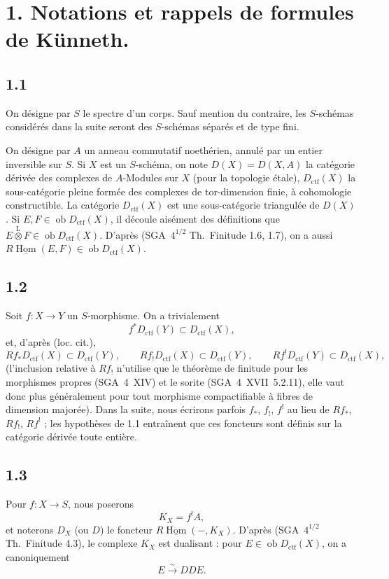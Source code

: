 \documentclass[11pt]{article}
\DeclareMathOperator{\Hom}{Hom}
\newcommand{\ob}{\operatorname{ob}}
\providecommand{\ctf}{\mathrm{ctf}}
\providecommand{\Hom}{\operatorname{Hom}}
\providecommand{\ob}{\operatorname{ob}}
\providecommand{\Hom}{\operatorname{Hom}}
\begin{document}
\section*{1. Notations et rappels de formules de Künneth.}

\subsection*{1.1}
On désigne par $S$ le spectre d'un corps. Sauf mention du contraire, les $S$-schémas considérés dans la suite seront des $S$-schémas séparés et de type fini.

On désigne par $A$ un anneau commutatif noethérien, annulé par un entier inversible sur $S$. Si $X$ est un $S$-schéma, on note $D(X)=D(X,A)$ la catégorie dérivée des complexes de $A$-Modules sur $X$ (pour la topologie étale), $D_{\ctf}(X)$ la sous-catégorie pleine formée des complexes de tor-dimension finie, à cohomologie constructible. La catégorie $D_{\ctf}(X)$ est une sous-catégorie triangulée de $D(X)$. Si $E,F \in \ob D_{\ctf}(X)$, il découle aisément des définitions que $E \overset{\mathrm{L}}{\otimes} F \in \ob D_{\ctf}(X)$. D'après (SGA~$4^{1/2}$ Th.~Finitude 1.6, 1.7), on a aussi $R\underline{\Hom}(E,F) \in \ob D_{\ctf}(X)$.

\subsection*{1.2}
Soit $f:X\to Y$ un $S$-morphisme. On a trivialement
\[
f^{*}D_{\ctf}(Y) \subset D_{\ctf}(X),
\]
et, d'après (loc. cit.),
\[
Rf_{*}D_{\ctf}(X) \subset D_{\ctf}(Y),\qquad
Rf_{!}D_{\ctf}(X) \subset D_{\ctf}(Y),\qquad
Rf^{!}D_{\ctf}(Y) \subset D_{\ctf}(X),
\]
(l'inclusion relative à $Rf_{!}$ n'utilise que le théorème de finitude pour les morphismes propres (SGA~4~XIV) et le sorite (SGA~4~XVII~5.2.11), elle vaut donc plus généralement pour tout morphisme compactifiable à fibres de dimension majorée). Dans la suite, nous écrirons parfois $f_{*}$, $f_{!}$, $f^{!}$ au lieu de $Rf_{*}$, $Rf_{!}$, $Rf^{!}$ ; les hypothèses de 1.1 entraînent que ces foncteurs sont définis sur la catégorie dérivée toute entière.

\subsection*{1.3}
Pour $f:X\to S$, nous poserons
\[
K_X=f^{!}A,
\]
et noterons $D_X$ (ou $D$) le foncteur $R\underline{\Hom}(-,K_X)$. D'après (SGA~$4^{1/2}$ Th.~Finitude 
4.3), le
complexe $K_X$ est dualisant : pour $E\in\ob D_{\ctf}(X)$, on a canoniquement
\[
E \xrightarrow{\sim} DDE.
\]
\end{document}
